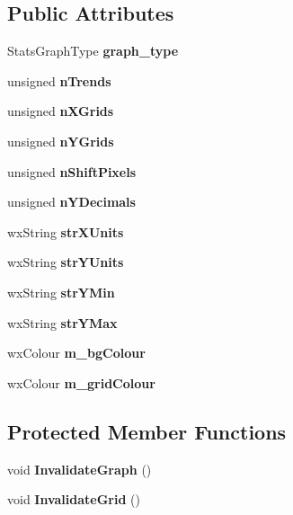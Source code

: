\subsection*{Public Attributes}
\begin{DoxyCompactItemize}
\item 
StatsGraphType {\bfseries graph\_\-type}\label{classCOScopeCtrl_a0a9c75c349bd7e1b44994cf0039660a9}

\item 
unsigned {\bfseries nTrends}\label{classCOScopeCtrl_af03bf05a1dd9001c304dca1973f89f18}

\item 
unsigned {\bfseries nXGrids}\label{classCOScopeCtrl_ab867d5fa66e8d0c60d5aae2cd402b64e}

\item 
unsigned {\bfseries nYGrids}\label{classCOScopeCtrl_a12d94fcece9b1ff7e42b2b4d329861fc}

\item 
unsigned {\bfseries nShiftPixels}\label{classCOScopeCtrl_a13030dd5e7c47bfbf5be76bdbffd6455}

\item 
unsigned {\bfseries nYDecimals}\label{classCOScopeCtrl_a88591ace15db5972272b836222069117}

\item 
wxString {\bfseries strXUnits}\label{classCOScopeCtrl_a0756b009a3095daf5348dc39ddc1395c}

\item 
wxString {\bfseries strYUnits}\label{classCOScopeCtrl_afb71eade618997a9e36c983e95e647ef}

\item 
wxString {\bfseries strYMin}\label{classCOScopeCtrl_ae5550732945bf0d06f68b5ba5d817158}

\item 
wxString {\bfseries strYMax}\label{classCOScopeCtrl_a5ca5ab4e09fd4de2441a050ae527b82f}

\item 
wxColour {\bfseries m\_\-bgColour}\label{classCOScopeCtrl_a9e0f710fe7bf733c8e711ac1016b05d7}

\item 
wxColour {\bfseries m\_\-gridColour}\label{classCOScopeCtrl_a9690177489934b041a7cae1f8ec3dd42}

\end{DoxyCompactItemize}
\subsection*{Protected Member Functions}
\begin{DoxyCompactItemize}
\item 
void {\bfseries InvalidateGraph} ()\label{classCOScopeCtrl_a028dded403eb2079379d632d58bc90ba}

\item 
void {\bfseries InvalidateGrid} ()\label{classCOScopeCtrl_a5d8de1661f8454cad8571290fe59046e}

\end{DoxyCompactItemize}
